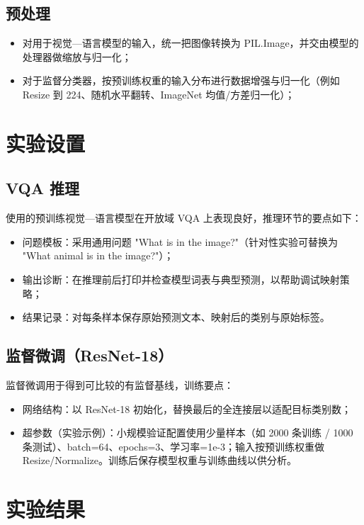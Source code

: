 \subsection{预处理}
\begin{itemize}
  \item 对用于视觉—语言模型的输入，统一把图像转换为 PIL.Image，并交由模型的处理器做缩放与归一化；
  \item 对于监督分类器，按预训练权重的输入分布进行数据增强与归一化（例如 Resize 到 224、随机水平翻转、ImageNet 均值/方差归一化）；
\end{itemize}

\section{实验设置}
\subsection{VQA 推理}
使用的预训练视觉—语言模型在开放域 VQA 上表现良好，推理环节的要点如下：
\begin{itemize}
  \item 问题模板：采用通用问题 "What is in the image?"（针对性实验可替换为 "What animal is in the image?"）；
  \item 输出诊断：在推理前后打印并检查模型词表与典型预测，以帮助调试映射策略；
  \item 结果记录：对每条样本保存原始预测文本、映射后的类别与原始标签。
\end{itemize}


\subsection{监督微调（ResNet-18）}
监督微调用于得到可比较的有监督基线，训练要点：
\begin{itemize}
  \item 网络结构：以 ResNet-18 初始化，替换最后的全连接层以适配目标类别数；
  \item 超参数（实验示例）：小规模验证配置使用少量样本（如 2000 条训练 / 1000 条测试）、batch=64、epochs=3、学习率=1e-3；输入按预训练权重做 Resize/Normalize。训练后保存模型权重与训练曲线以供分析。 
\end{itemize}

\section{实验结果}

